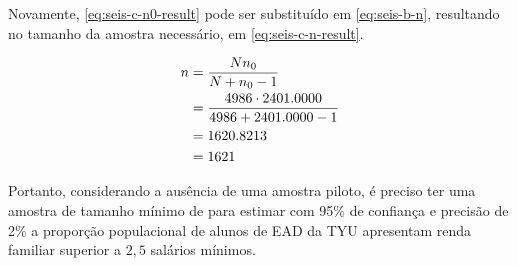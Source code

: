 	Novamente, \eqref{eq:seis-c-n0-result} pode ser substituído em
	\eqref{eq:seis-b-n}, resultando no tamanho da amostra necessário, em
	\eqref{eq:seis-c-n-result}.

	\begin{align}
		n &= \frac{N n_0}{N + n_0 - 1} \nonumber \\
		  &= \frac{4986 \cdot 2401.0000}{4986 + 2401.0000 - 1} \nonumber \\
		  &= 1620.8213 \nonumber \\
		  &= \label{eq:seis-c-n-result} 
			 1621
	\end{align}

	Portanto, considerando a ausência de uma amostra piloto, é preciso ter uma
	amostra de tamanho mínimo de \SEISCnceil para estimar com 95\% de
	confiança e precisão de 2\% a proporção populacional de alunos de EAD da TYU
	apresentam renda familiar superior a $2,5$ salários mínimos.
